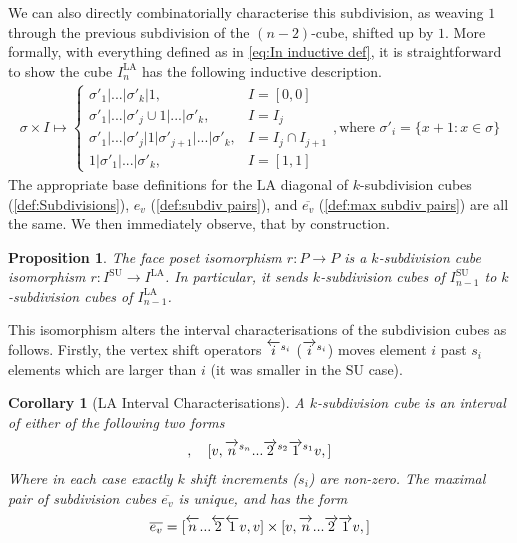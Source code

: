 \documentclass{amsart}
\newtheorem{corollary}[theorem]{Corollary}
\newtheorem{proposition}[theorem]{Proposition}
\theoremstyle{definition}
\newcommand{\SU}{\mathrm{SU}}
\newcommand{\LA}{\mathrm{LA}}
\newcommand{\rightshift}[1]{\overrightarrow{\vphantom{1}{#1}}}
\newcommand{\rightshiftk}[2]{\overrightarrow{\vphantom{1}{#1}}^{#2}}
\newcommand{\leftshift}[1]{\overleftarrow{\vphantom{1}{#1}}}
\newcommand{\leftshiftk}[2]{\overleftarrow{\vphantom{1}{#1}}^{#2}}
\newcommand{\subdivpairsv}{e_v}
\newcommand{\maxsubdivpairsv}{\overline{e_v}}
\begin{document}
We can also directly combinatorially characterise this subdivision, as  weaving $1$ through the previous subdivision of the $(n-2)$-cube, shifted up by $1$.
More formally, with everything defined as in \cref{eq:In inductive def}, it is straightforward to show the cube $I_{n}^{\LA}$ has the following inductive description.
\begin{align} \label{eq:In LA inductive def}
    \sigma \times I \mapsto 
    \begin{cases}
        \sigma'_1|...|\sigma'_k| 1, &I = [0, 0]\\
        \sigma'_1|...|\sigma'_j \cup 1|...|\sigma'_k, &I = I_j\\
        \sigma'_1|...|\sigma'_j|1|\sigma'_{j+1}|...|\sigma'_k, &I = I_j \cap I_{j+1}\\
        1|\sigma'_1|...|\sigma'_k, &I = [1, 1]
    \end{cases}
    , \text{where } \sigma'_i = \{x+1:x\in \sigma\}
\end{align}
The appropriate base definitions for the $\LA$ diagonal of $k$-subdivision cubes (\ref{def:Subdivisions}),  ${\subdivpairsv}$ (\ref{def:subdiv pairs}), and $\maxsubdivpairsv$ (\ref{def:max subdiv pairs}) are all the same.
We then immediately observe, that by construction.
\begin{proposition}
The face poset isomorphism $r: P\to P$ is a $k$-subdivision cube isomorphism $r:I^{\SU}\to I^{\LA}$. In particular, it sends $k$-subdivision cubes of $I^{\SU}_{n-1}$ to $k$-subdivision cubes of $I^{\LA}_{n-1}$.
\end{proposition}
This isomorphism alters the interval characterisations of the subdivision cubes as follows.
Firstly, the vertex shift operators $\leftshiftk{i}{s_i}$ ($\rightshiftk{i}{s_i}$) moves element $i$ past $s_i$ elements which are larger than $i$ (it was smaller in the $\SU$ case).
\begin{corollary}[LA Interval Characterisations]
A $k$-subdivision cube is an interval of either of the following two forms
\begin{align*}
     [\leftshiftk{n}{s_n}...\leftshiftk{2}{s_{2}}\leftshiftk{1}{s_1}v,v], \quad [v,\rightshiftk{n}{s_n}... \rightshiftk{2}{s_{2}}\rightshiftk{1}{s_1}v,]
\end{align*}
Where in each case exactly $k$ shift increments ($s_i$) are non-zero.
The maximal pair of subdivision cubes $\maxsubdivpairsv$ is unique, and has the form 
\begin{align*}
    \maxsubdivpairsv=[\leftshift{n}...\leftshift{2}\leftshift{1}v,v] \times [v,\rightshift{n}... \rightshift{2}\rightshift{1}v,]
\end{align*}

\end{corollary}
\end{document}
